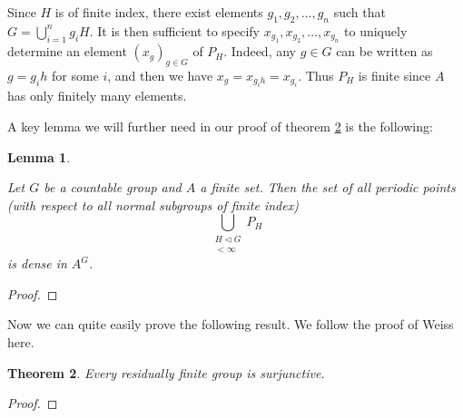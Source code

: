 \documentclass[titlepage, a4paper]{article}
\newtheorem{theorem}{Theorem}[section]
\newtheorem{lemma}[theorem]{Lemma}
\theoremstyle{definition}
\theoremstyle{remark}
\begin{document}

Since $H$ is of finite index, there exist elements $g_1, g_2, \dots, g_n$ such that $G = \bigcup_{i=1}^n g_i H$. It is then sufficient to specify $x_{g_1}, x_{g_2}, \dots, x_{g_n}$ to uniquely determine an element $(x_g)_{g \in G}$ of $P_H$. Indeed, any $g \in G$ can be written as $g = g_ih$ for some $i$, and then we have $x_g = x_{g_ih} = x_{g_i}$. Thus $P_H$ is finite since $A$ has only finitely many elements.

A key lemma we will further need in our proof of theorem \ref{thm:res_fin_surjunctive} is the following:

\begin{lemma} \label{lem:h-periodic_points}
    
Let $G$ be a countable group and $A$ a finite set. Then the set of all periodic points (with respect to all normal subgroups of finite index)
    \[
    \bigcup_{\substack{ H \triangleleft G \\ [G : H] < \infty}} P_H
    \]
is dense in $A^G$.
\end{lemma}
\begin{proof}
% 

\end{proof}

Now we can quite easily prove the following result. We follow the proof of Weiss \cite[Theorem 1.3]{weiss_2000} here.
\begin{theorem} \label{thm:res_fin_surjunctive}
    Every residually finite group is surjunctive.
\end{theorem}
\begin{proof}
    
\end{proof}
\end{document}
